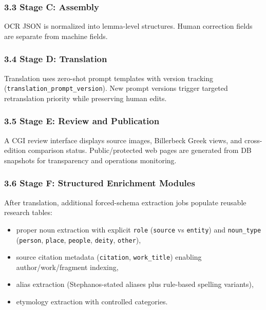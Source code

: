 \documentclass[
]{article}
\providecommand{\tightlist}{%
  \setlength{\itemsep}{0pt}\setlength{\parskip}{0pt}}
\begin{document}
\hypertarget{33-stage-c-assembly}{%
\subsubsection{3.3 Stage C: Assembly}\label{33-stage-c-assembly}}

OCR JSON is normalized into lemma-level structures. Human correction
fields are separate from machine fields.

\hypertarget{34-stage-d-translation}{%
\subsubsection{3.4 Stage D: Translation}\label{34-stage-d-translation}}

Translation uses zero-shot prompt templates with version tracking
(\texttt{translation\_prompt\_version}). New prompt versions trigger
targeted retranslation priority while preserving human edits.

\hypertarget{35-stage-e-review-and-publication}{%
\subsubsection{3.5 Stage E: Review and
Publication}\label{35-stage-e-review-and-publication}}

A CGI review interface displays source images, Billerbeck Greek views,
and cross-edition comparison status. Public/protected web pages are
generated from DB snapshots for transparency and operations monitoring.

\hypertarget{36-stage-f-structured-enrichment-modules}{%
\subsubsection{3.6 Stage F: Structured Enrichment
Modules}\label{36-stage-f-structured-enrichment-modules}}

After translation, additional forced-schema extraction jobs populate
reusable research tables:

\begin{itemize}
\tightlist
\item
  proper noun extraction with explicit \texttt{role} (\texttt{source} vs
  \texttt{entity}) and \texttt{noun\_type} (\texttt{person},
  \texttt{place}, \texttt{people}, \texttt{deity}, \texttt{other}),
\item
  source citation metadata (\texttt{citation}, \texttt{work\_title})
  enabling author/work/fragment indexing,
\item
  alias extraction (Stephanos-stated aliases plus rule-based spelling
  variants),
\item
  etymology extraction with controlled categories.
\end{itemize}
\end{document}
